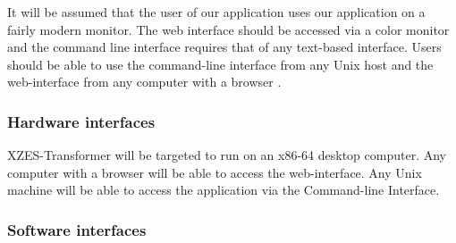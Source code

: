 It will be assumed that the user of our application uses our application on a fairly modern monitor.
The web interface should be accessed via a color monitor and the command line interface requires that of any text-based interface.
Users should be able to use the command-line interface from any Unix host and the web-interface from any computer with a browser .


\subsubsection{Hardware interfaces}

XZES-Transformer will be targeted to run on an x86-64 desktop computer.
Any computer with a browser will be able to access the web-interface.
Any Unix machine will be able to access the application via the Command-line Interface.


\subsubsection{Software interfaces}

